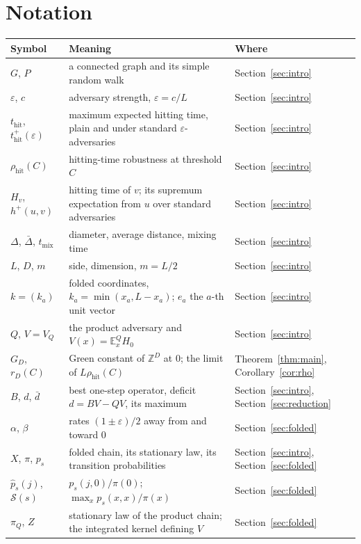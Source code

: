\documentclass[11pt]{amsart}
\theoremstyle{remark}
\newcommand{\eps}{\varepsilon}
\newcommand{\E}{\mathbb{E}}
\newcommand{\Z}{\mathbb{Z}}
\newcommand{\thit}{t_{\mathrm{hit}}}
\newcommand{\rhit}{\rho_{\mathrm{hit}}}
\begin{document}
\appendix
\section{Notation}\label{app:notation}
\begin{center}
\begin{tabular}{@{}lp{}l@{}}
\toprule
Symbol & Meaning & Where\\ \midrule
$G$, $P$ & a connected graph and its simple random walk & Section~\ref{sec:intro}\\
$\eps$, $c$ & adversary strength, $\eps=c/L$ & Section~\ref{sec:intro}\\
$\thit$, $\thit^+(\eps)$ & maximum expected hitting time, plain and under standard $\eps$-adversaries & Section~\ref{sec:intro}\\
$\rhit(C)$ & hitting-time robustness at threshold $C$ & Section~\ref{sec:intro}\\
$H_v$, $h^+(u,v)$ & hitting time of $v$; its supremum expectation from $u$ over standard adversaries & Section~\ref{sec:intro}\\
$\Delta$, $\bar\Delta$, $t_{\mathrm{mix}}$ & diameter, average distance, mixing time & Section~\ref{sec:intro}\\
$L$, $D$, $m$ & side, dimension, $m=L/2$ & Section~\ref{sec:intro}\\
$k=(k_a)$ & folded coordinates, $k_a=\min(x_a,L-x_a)$; $e_a$ the $a$-th unit vector & Section~\ref{sec:intro}\\
$Q$, $V=V_Q$ & the product adversary and $V(x)=\E^Q_xH_0$ & Section~\ref{sec:intro}\\
$G_D$, $r_D(C)$ & Green constant of $\Z^D$ at $0$; the limit of $L\rhit(C)$ & Theorem~\ref{thm:main}, Corollary~\ref{cor:rho}\\
$B$, $d$, $\bar d$ & best one-step operator, deficit $d=BV-QV$, its maximum & Section~\ref{sec:intro}, Section~\ref{sec:reduction}\\
$\alpha$, $\beta$ & rates $(1\pm\eps)/2$ away from and toward $0$ & Section~\ref{sec:folded}\\
$X$, $\pi$, $p_s$ & folded chain, its stationary law, its transition probabilities & Section~\ref{sec:intro}, Section~\ref{sec:folded}\\
$\hat p_s(j)$, $\mathcal S(s)$ & $p_s(j,0)/\pi(0)$; $\max_xp_s(x,x)/\pi(x)$ & Section~\ref{sec:folded}\\
$\pi_Q$, $Z$ & stationary law of the product chain; the integrated kernel defining $V$ & Section~\ref{sec:folded}\\

\end{tabular}
\end{center}
\end{document}
